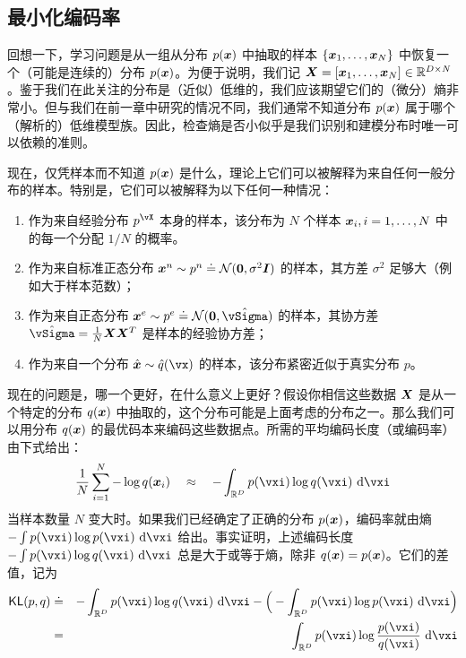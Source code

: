 \documentclass[../../book-main.tex]{subfiles}
\begin{document}
\subsection{最小化编码率}\label{sub:min_entropy}
回想一下，学习问题是从一组从分布 $p(\bm{x})$ 中抽取的样本 $\{\bm{x}_1, \ldots, \bm{x}_N\}$ 中恢复一个（可能是连续的）分布 $p(\bm{x})$。为便于说明，我们记 $\bm{X} = [\bm{x}_1, \ldots, \bm{x}_N] \in \mathbb{R}^{D\times N}$。鉴于我们在此关注的分布是（近似）低维的，我们应该期望它们的（微分）熵非常小。但与我们在前一章中研究的情况不同，我们通常不知道分布 $p(\bm{x})$ 属于哪个（解析的）低维模型族。因此，检查熵是否小似乎是我们识别和建模分布时唯一可以依赖的准则。

现在，仅凭样本而不知道 $p(\bm{x})$ 是什么，理论上它们可以被解释为来自任何一般分布的样本。特别是，它们可以被解释为以下任何一种情况：
\begin{enumerate}
	\item 作为来自经验分布 $p^{\vX}$ 本身的样本，该分布为 $N$ 个样本 $\bm{x}_i, i=1, \ldots, N$ 中的每一个分配 $1/N$ 的概率。
	\item 作为来自标准正态分布 $\bm{x}^n \sim p^{n} \doteq \mathcal{N}(\boldsymbol{0}, \sigma^2 \boldsymbol{I})$ 的样本，其方差 $\sigma^2$ 足够大（例如大于样本范数）；
	\item 作为来自正态分布 $\x^e \sim p^{e} \doteq \mathcal{N}(\boldsymbol{0}, \hat{\vSigma})$ 的样本，其协方差 $\hat{\vSigma} = \frac{1}{N} \X \X^T$ 是样本的经验协方差；
	\item 作为来自一个分布 $\hat \x \sim \hat{q}(\vx)$ 的样本，该分布紧密近似于真实分布 $p$。
\end{enumerate}
现在的问题是，哪一个更好，在什么意义上更好？假设你相信这些数据 $\bm{X}$ 是从一个特定的分布 $q(\bm{x})$ 中抽取的，这个分布可能是上面考虑的分布之一。那么我们可以用分布 $q(\bm{x})$ 的最优码本来编码这些数据点。所需的平均编码长度（或编码率）由下式给出：
\begin{equation}
	\frac{1}{N}\sum_{i=1}^N -\log q(\x_i) \quad \approx \quad - \int_{\R^{D}} p(\vxi) \log q(\vxi)\odif{\vxi}
\end{equation}
当样本数量 $N$ 变大时。如果我们已经确定了正确的分布 $p(\bm{x})$，编码率就由熵 $- \int p(\vxi) \log p(\vxi) \odif{\vxi}$ 给出。事实证明，上述编码长度 $- \int p(\vxi) \log q(\vxi) \odif{\vxi}$ 总是大于或等于熵，除非 $q(\bm{x}) = p(\bm{x})$。它们的差值，记为
\begin{eqnarray}
	\KL(p, q) &\doteq& - \int_{\R^{D}} p(\vxi) \log q(\vxi) \odif{\vxi}  - \Big(- \int_{\R^{D}} p(\vxi) \log p(\vxi) \odif{\vxi} \Big)\\
	&=& \int_{\R^{D}} p(\vxi) \log \frac{p(\vxi)}{q(\vxi)} \odif{\vxi}
\end{eqnarray}
\end{document}
